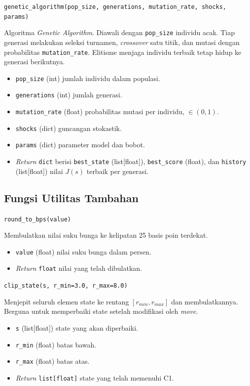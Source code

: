 \texttt{genetic\_algorithm(pop\_size, generations, mutation\_rate, shocks, params)}

Algoritma \textit{Genetic Algorithm}. Diawali dengan \texttt{pop\_size} individu acak. Tiap generasi melakukan seleksi turnamen, \textit{crossover} satu titik, dan mutasi dengan probabilitas \texttt{mutation\_rate}. Elitisme menjaga individu terbaik tetap hidup ke generasi berikutnya.

\begin{itemize}
    \item \texttt{pop\_size} (int) jumlah individu dalam populasi.
    \item \texttt{generations} (int) jumlah generasi.
    \item \texttt{mutation\_rate} (float) probabilitas mutasi per individu, $\in (0, 1)$.
    \item \texttt{shocks} (dict) guncangan stokastik.
    \item \texttt{params} (dict) parameter model dan bobot.
    \item \textit{Return} \texttt{dict} berisi \texttt{best\_state} (list[float]), \texttt{best\_score} (float), dan \texttt{history} (list[float]) nilai $J(s)$ terbaik per generasi.
\end{itemize}

\subsection*{Fungsi Utilitas Tambahan}

\texttt{round\_to\_bps(value)}

Membulatkan nilai suku bunga ke kelipatan 25 basis poin terdekat.

\begin{itemize}
    \item \texttt{value} (float) nilai suku bunga dalam persen.
    \item \textit{Return} \texttt{float} nilai yang telah dibulatkan.
\end{itemize}

\texttt{clip\_state(s, r\_min=3.0, r\_max=8.0)}

Menjepit seluruh elemen state ke rentang $[r_{min}, r_{max}]$ dan membulatkannya. Berguna untuk memperbaiki state setelah modifikasi oleh \textit{move}.

\begin{itemize}
    \item \texttt{s} (list[float]) state yang akan diperbaiki.
    \item \texttt{r\_min} (float) batas bawah.
    \item \texttt{r\_max} (float) batas atas.
    \item \textit{Return} \texttt{list[float]} state yang telah memenuhi C1.
\end{itemize}

